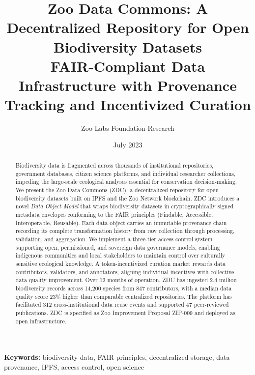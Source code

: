 \documentclass[11pt,a4paper]{article}
\title{\textbf{Zoo Data Commons: A Decentralized Repository for Open Biodiversity Datasets} \\[0.5em]
\large FAIR-Compliant Data Infrastructure with Provenance Tracking and Incentivized Curation}
\author[1]{Zoo Labs Foundation Research}
\affil[1]{Zoo Labs Foundation Research, Research Division \\ \texttt{research@zoo.ngo}}
\date{July 2023}
\begin{document}
\zoocoverpage

\begin{abstract}
\noindent
Biodiversity data is fragmented across thousands of institutional repositories, government databases, citizen science platforms, and individual researcher collections, impeding the large-scale ecological analyses essential for conservation decision-making.
We present the Zoo Data Commons (ZDC), a decentralized repository for open biodiversity datasets built on IPFS and the Zoo Network blockchain.
ZDC introduces a novel \emph{Data Object Model} that wraps biodiversity datasets in cryptographically signed metadata envelopes conforming to the FAIR principles (Findable, Accessible, Interoperable, Reusable).
Each data object carries an immutable provenance chain recording its complete transformation history from raw collection through processing, validation, and aggregation.
We implement a three-tier access control system supporting open, permissioned, and sovereign data governance models, enabling indigenous communities and local stakeholders to maintain control over culturally sensitive ecological knowledge.
A token-incentivized curation market rewards data contributors, validators, and annotators, aligning individual incentives with collective data quality improvement.
Over 12 months of operation, ZDC has ingested 2.4 million biodiversity records across 14,200 species from 847 contributors, with a median data quality score 23\% higher than comparable centralized repositories.
The platform has facilitated 312 cross-institutional data reuse events and supported 47 peer-reviewed publications.
ZDC is specified as Zoo Improvement Proposal ZIP-009 and deployed as open infrastructure.
\end{abstract}

\vspace{0.5em}
\noindent\textbf{Keywords:} biodiversity data, FAIR principles, decentralized storage, data provenance, IPFS, access control, open science












\end{document}
